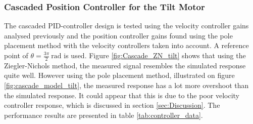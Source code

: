 \documentclass[../../main.tex]{subfiles}
\begin{document}
\subsubsection*{Cascaded Position Controller for the Tilt Motor}
The cascaded PID-controller design is tested using the velocity controller gains analysed previously and the position controller gains found using the pole placement method with the velocity controllers taken into account. A reference point of $\theta = \frac{3\pi}{2} \SI{}{\radian}$ is used. Figure \ref{fig:Cascade_ZN_tilt} shows that using the Ziegler-Nichols method, the measured signal resembles the simulated response quite well. However using the pole placement method, illustrated on figure \ref{fig:cascade_model_tilt}, the measured response has a lot more overshoot than the simulated response. It could appear that this is due to the poor velocity controller response, which is discussed in section \ref{sec:Discussion}. The performance results are presented in table \ref{tab:controller_data}.
\end{document}
